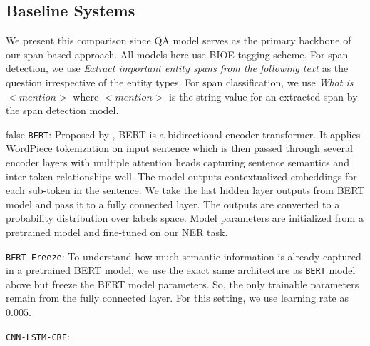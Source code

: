 
\subsection{Baseline Systems}


We present this comparison since QA model serves as the primary backbone of our span-based approach. 
All models here use BIOE tagging scheme.
For span detection, we use \textit{Extract important entity spans from the following text} as the question irrespective of the entity types.
For span classification, we use \textit{What is $<mention>$} where $<mention>$ is the string value for an extracted span by the span detection model.  

\if false  
\texttt{BERT}: Proposed by \cite{devlin2018bert}, BERT is a bidirectional encoder transformer\cite{vaswani2017attention}. It applies WordPiece\cite{wu2016google} tokenization on input sentence which is then passed through several encoder layers with multiple attention heads capturing sentence semantics and inter-token relationships well. The model outputs contextualized embeddings for each sub-token in the sentence. We take the last hidden layer outputs from BERT model and pass it to a fully connected layer. The outputs are converted to a probability distribution over labels space. Model parameters are initialized from a pretrained model and fine-tuned on our NER task.


\texttt{BERT-Freeze}: To understand how much semantic information is already captured in a pretrained BERT model, we use the exact same architecture as \texttt{BERT} model above but freeze the BERT model parameters. So, the only trainable parameters remain from the fully connected layer. For this setting, we use learning rate as $0.005$.

\texttt{CNN-LSTM-CRF}: 
\fi

